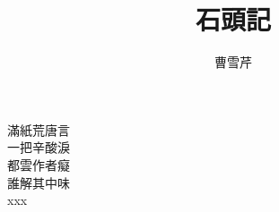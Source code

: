 \documentclass[12pt]{article}
\title{石頭記}
\author{曹雪芹}
\date{}
\begin{document}
\maketitle

\begin{center}
滿紙荒唐言\\
一把辛酸淚\\
都雲作者癡\\
誰解其中味\\
xxx\\
\end{center}
\end{document}
